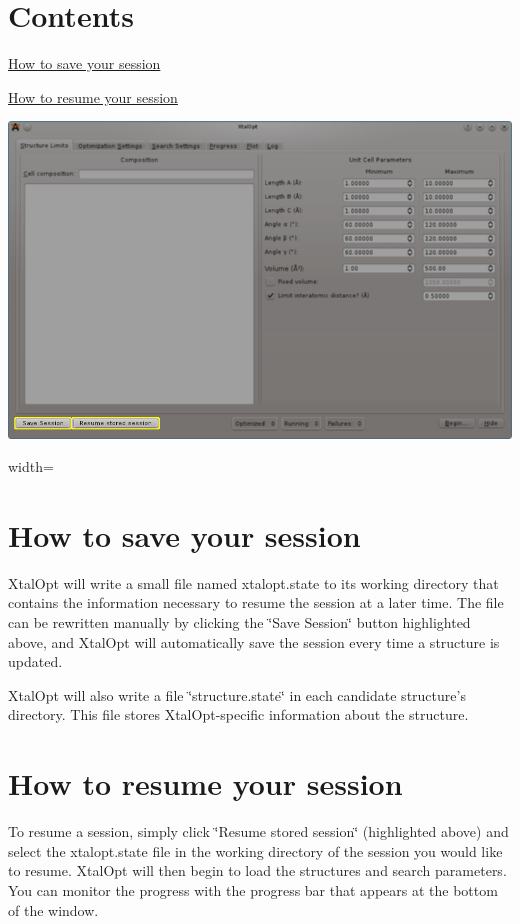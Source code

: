 \hypertarget{xo_saveresume_sr_contents}{}\section{Contents}\label{xo_saveresume_sr_contents}

\begin{DoxyItemize}
\item \hyperlink{xo_saveresume_sr_saving}{How to save your session}
\item \hyperlink{xo_saveresume_sr_resuming}{How to resume your session}
\end{DoxyItemize}

 
\begin{DoxyImage}
\includegraphics{xo-saveresume.png}
\caption{width=}
\end{DoxyImage}
\hypertarget{xo_saveresume_sr_saving}{}\section{How to save your session}\label{xo_saveresume_sr_saving}
Xtal\-Opt will write a small file named xtalopt.\-state to its working directory that contains the information necessary to resume the session at a later time. The file can be rewritten manually by clicking the \char`\"{}\-Save Session\char`\"{} button highlighted above, and Xtal\-Opt will automatically save the session every time a structure is updated.

Xtal\-Opt will also write a file \char`\"{}structure.\-state\char`\"{} in each candidate structure's directory. This file stores Xtal\-Opt-\/specific information about the structure.\hypertarget{xo_saveresume_sr_resuming}{}\section{How to resume your session}\label{xo_saveresume_sr_resuming}
To resume a session, simply click \char`\"{}\-Resume stored session\char`\"{} (highlighted above) and select the xtalopt.\-state file in the working directory of the session you would like to resume. Xtal\-Opt will then begin to load the structures and search parameters. You can monitor the progress with the progress bar that appears at the bottom of the window.

